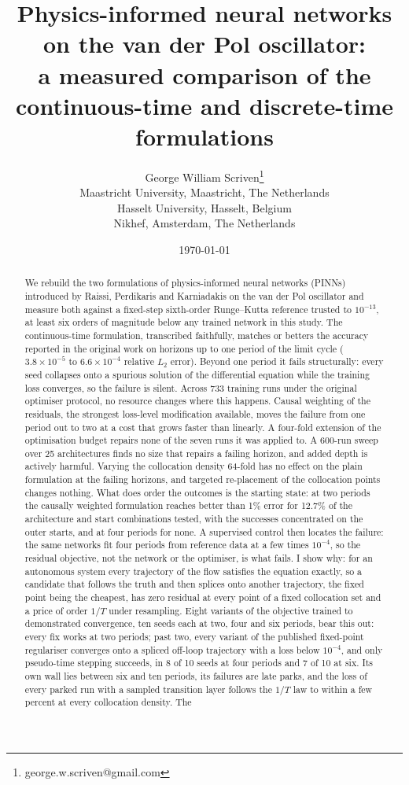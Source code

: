 \documentclass[11pt,a4paper]{article}
\title{Physics-informed neural networks on the van der Pol oscillator:\\
a measured comparison of the continuous-time and discrete-time formulations}
\author{George William Scriven\thanks{george.w.scriven@gmail.com}\\[2pt]
\normalsize Maastricht University, Maastricht, The Netherlands\\
\normalsize Hasselt University, Hasselt, Belgium\\
\normalsize Nikhef, Amsterdam, The Netherlands}
\date{\today}
\begin{document}
\maketitle

\begin{abstract}
We rebuild the two formulations of physics-informed neural networks (PINNs)
introduced by Raissi, Perdikaris and Karniadakis on the van der Pol
oscillator and measure both against a fixed-step sixth-order Runge--Kutta
reference trusted to $10^{-13}$, at least six orders of magnitude below any
trained network in this study. The continuous-time formulation, transcribed
faithfully, matches or betters the accuracy reported in the original work
on horizons up to one period of the limit cycle ($3.8\times10^{-5}$ to
$6.6\times10^{-4}$ relative $L_2$ error). Beyond one period it fails
structurally: every seed collapses onto a spurious solution of the
differential equation while the training loss converges, so the failure is
silent. Across 733 training runs under the original optimiser protocol, no resource changes where this happens.
Causal weighting of the residuals, the strongest loss-level modification
available, moves the failure from one period out to two at a cost that
grows faster than linearly. A four-fold extension of the optimisation
budget repairs none of the seven runs it was applied to. A 600-run sweep
over 25 architectures finds no size that repairs a failing horizon, and
added depth is actively harmful. Varying the collocation density 64-fold
has no effect on the plain formulation at the failing horizons, and
targeted re-placement of the collocation points changes nothing. What does
order the outcomes is the starting state: at two periods the causally
weighted formulation reaches better than 1\% error for 12.7\% of the
architecture and start combinations tested, with the successes
concentrated on the outer starts, and at four periods for none. A supervised control then locates the failure: the same networks fit four periods from reference data at a few times $10^{-4}$, so the residual objective, not the network or the optimiser, is what fails. I show why: for an autonomous system every trajectory of the flow satisfies the equation exactly, so a candidate that follows the truth and then splices onto another trajectory, the fixed point being the cheapest, has zero residual at every point of a fixed collocation set and a price of order $1/T$ under resampling. Eight variants of the objective trained to demonstrated convergence, ten seeds each at two, four and six periods, bear this out: every fix works at two periods; past two, every variant of the published fixed-point regulariser converges onto a spliced off-loop trajectory with a loss below $10^{-4}$, and only pseudo-time stepping succeeds, in 8 of 10 seeds at four periods and 7 of 10 at six. Its own wall lies between six and ten periods, its failures are late parks, and the loss of every parked run with a sampled transition layer follows the $1/T$ law to within a few percent at every collocation density. The

\end{abstract}
\end{document}
